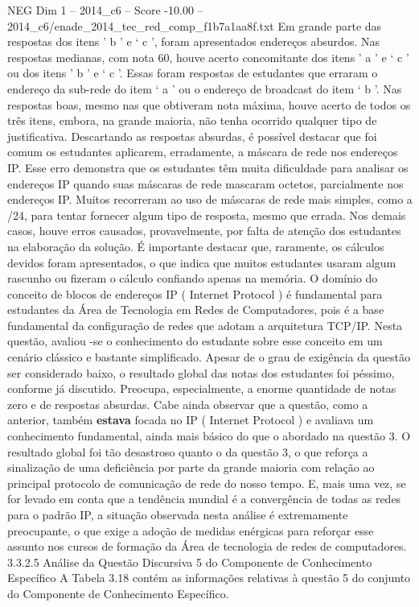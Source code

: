 \begin{textsample}{NEG Dim 1 – 2014\_c6 – Score -10.00 – 2014\_c6/enade\_2014\_tec\_red\_comp\_f1b7a1aa8f.txt}
Em grande parte das respostas dos itens ’ b ’ e ‘ c ’, foram apresentados endereços absurdos.
Nas respostas medianas, com nota 60, houve acerto concomitante dos itens ’ a ’ e ‘ c ’ ou dos itens ’ b ’ e ‘ c ’.
Essas foram respostas de estudantes que erraram o endereço da sub-rede do item ‘ a ’ ou o endereço de broadcast do item ‘ b ’.
Nas respostas boas, mesmo nas que obtiveram nota máxima, houve acerto de todos os três itens, embora, na grande maioria, não tenha ocorrido qualquer tipo de justificativa.
Descartando as respostas absurdas, é possível destacar que foi comum os estudantes aplicarem, erradamente, a máscara de rede nos endereços IP.
Esse erro demonstra que os estudantes têm muita dificuldade para analisar os endereços IP quando suas máscaras de rede mascaram octetos, parcialmente nos endereços IP.
Muitos recorreram ao uso de máscaras de rede mais simples, como a /24, para tentar fornecer algum tipo de resposta, mesmo que errada.
Nos demais casos, houve erros causados, provavelmente, por falta de atenção dos estudantes na elaboração da solução.
É importante destacar que, raramente, os cálculos devidos foram apresentados, o que indica que muitos estudantes usaram algum rascunho ou fizeram o cálculo confiando apenas na memória.
O domínio do conceito de blocos de endereços IP ( Internet Protocol ) é fundamental para estudantes da Área de Tecnologia em Redes de Computadores, pois é a base fundamental da configuração de redes que adotam a arquitetura TCP/IP.
Nesta questão, avaliou -se o conhecimento do estudante sobre esse conceito em um cenário clássico e bastante simplificado.
Apesar de o grau de exigência da questão ser considerado baixo, o resultado global das notas dos estudantes foi péssimo, conforme já discutido.
Preocupa, especialmente, a enorme quantidade de notas zero e de respostas absurdas.
Cabe ainda observar que a questão, como a anterior, também \textbf{estava} focada no IP ( Internet Protocol ) e avaliava um conhecimento fundamental, ainda mais básico do que o abordado na questão 3.
O resultado global foi tão desastroso quanto o da questão 3, o que reforça a sinalização de uma deficiência por parte da grande maioria com relação ao principal protocolo de comunicação de rede do nosso tempo.
E, mais uma vez, se for levado em conta que a tendência mundial é a convergência de todas as redes para o padrão IP, a situação observada nesta análise é extremamente preocupante, o que exige a adoção de medidas enérgicas para reforçar esse assunto nos cursos de formação da Área de tecnologia de redes de computadores. 3.3.2.5 Análise da Questão Discursiva 5 do Componente de Conhecimento Específico A Tabela 3.18 contém as informações relativas à questão 5 do conjunto do Componente de Conhecimento Específico.

\end{textsample}
